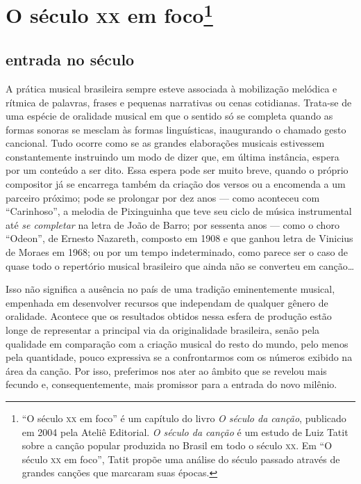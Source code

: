 \chapter{O século \textsc{xx} em foco\footnote{``O século \textsc{xx} em foco'' é um capítulo do livro \textit{O século da canção}, publicado em 2004 pela Ateliê Editorial. \textit{O século da canção} é um estudo de Luiz Tatit sobre a canção popular produzida no Brasil em todo o século \textsc{xx}. Em ``O século \textsc{xx} em foco'', Tatit propõe uma análise do século passado através de grandes canções que marcaram suas épocas.}}

\section{entrada no século}

A prática musical brasileira sempre esteve associada à mobilização
melódica e rítmica de palavras, frases e pequenas narrativas ou cenas
cotidianas. Trata-se de uma espécie de oralidade musical em que o
sentido só se completa quando as formas sonoras se mesclam às formas
linguísticas, inaugurando o chamado gesto cancional. Tudo ocorre como se
as grandes elaborações musicais estivessem constantemente instruindo um
modo de dizer que, em última instância, espera por um conteúdo a ser
dito. Essa espera pode ser muito breve, quando o próprio compositor já
se encarrega também da criação dos versos ou a encomenda a um parceiro
próximo; pode se prolongar por dez anos --- como aconteceu com
``Carinhoso'', a melodia de Pixinguinha que teve seu ciclo de música
instrumental até \textit{se completar} na letra de João de Barro; por
sessenta anos --- como o choro ``Odeon'', de Ernesto Nazareth, composto
em 1908 e que ganhou letra de Vinicius de Moraes em 1968; ou por um
tempo indeterminado, como parece ser o caso de quase todo o repertório
musical brasileiro que ainda não se converteu em canção\ldots

Isso não significa a ausência no país de uma tradição eminentemente
musical, empenhada em desenvolver recursos que independam de qualquer
gênero de oralidade. Acontece que os resultados obtidos nessa esfera de
produção estão longe de representar a principal via da originalidade
brasileira, senão pela qualidade em comparação com a criação musical do
resto do mundo, pelo menos pela quantidade, pouco expressiva se a
confrontarmos com os números exibido na área da canção. Por isso,
preferimos nos ater ao âmbito que se revelou mais fecundo e,
consequentemente, mais promissor para a entrada do novo milênio.

